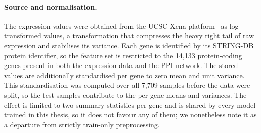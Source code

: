 \paragraph{Source and normalisation.} The expression values were obtained from the UCSC Xena
platform~\cite{goldman2020xena} as log-transformed  values, a
transformation that compresses the heavy right tail of raw expression and stabilises its variance.
Each gene is identified by its STRING-DB protein identifier, so the feature set is restricted to the
14{,}133 protein-coding genes present in both the expression data and the PPI network. The stored
values are additionally standardised per gene to zero mean and unit variance. This standardisation
was computed over all 7{,}709 samples before the data were split, so the test samples contribute to
the per-gene means and variances. The effect is limited to two summary statistics per gene and is
shared by every model trained in this thesis, so it does not favour any of them; we nonetheless
note it as a departure from strictly train-only preprocessing.
